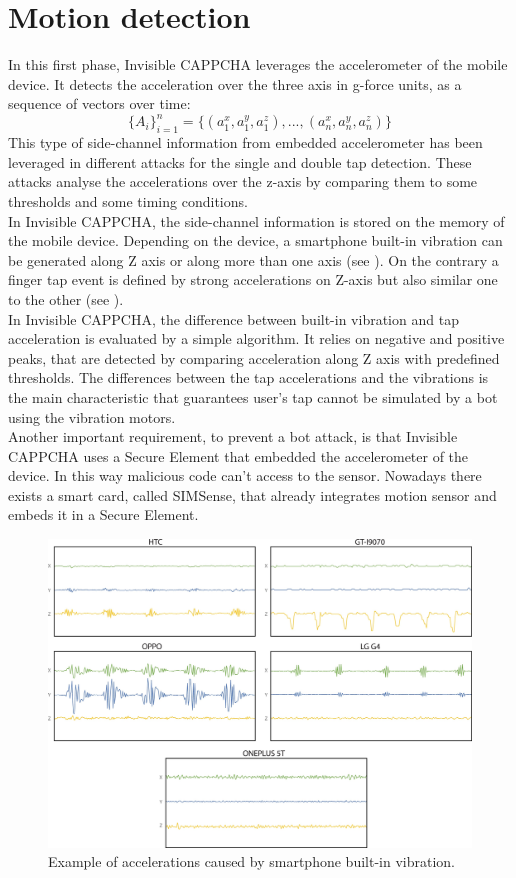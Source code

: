 \section{Motion detection}
In this first phase, Invisible CAPPCHA leverages the accelerometer of the mobile device. It detects the acceleration over the three axis in g-force units, as a sequence of vectors over time:
$$\{ A_i\}_{i=1}^{n} = \{ (a_1^x, a_1^y, a_1^z), ..., (a_n^x, a_n^y, a_n^z)\}$$
This type of side-channel information from embedded accelerometer has been leveraged in different attacks for the single and double tap detection. These attacks analyse the accelerations over the z-axis by comparing them to some thresholds and some timing conditions.\\
In Invisible CAPPCHA, the side-channel information is stored on the memory of the mobile device. Depending on the device, a smartphone built-in vibration can be generated along Z axis or along more than one axis (see ). On the contrary a finger tap event is defined by strong accelerations on Z-axis but also similar one to the other (see ).\\
In Invisible CAPPCHA, the difference between built-in vibration and tap acceleration is evaluated by a simple algorithm. It relies on negative and positive peaks, that are detected by comparing acceleration along Z axis with predefined thresholds. The differences between the tap accelerations and the vibrations is the main characteristic that guarantees user's tap cannot be simulated by a bot using the vibration motors.\\
Another important requirement, to prevent a bot attack, is that Invisible CAPPCHA uses a Secure Element that embedded the accelerometer of the device. In this way malicious code can't access to the sensor. Nowadays there exists a smart card, called SIMSense, that already integrates motion sensor and embeds it in a Secure Element.\\
\begin{figure}[h]
     \centering
     \includegraphics[width=.8\linewidth]{Images/InvisibleCAPPCHA/vibration}
     \caption{\footnotesize{Example of accelerations caused by smartphone built-in vibration.}}\label{inv:vibration}
\end{figure}
